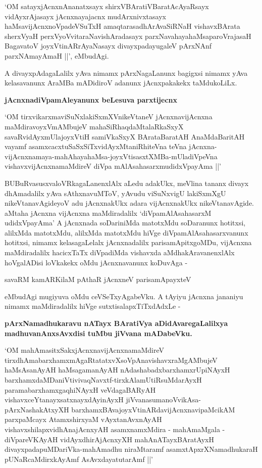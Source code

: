 `OM satayxjAcnxnAnanatxsayx shirxVBAratiVBaratAcAyaRsayx vidAyxrAjasayx jAcnxnayajacnx mudArxnivxtasayx haMsa\-vi\-jAcnxnoV\-padeVSuTxH amaqtarasadhArAvaSiRNaH vishavxBArata sherxVyaH perxVyoVvitaraNavishAradasayx parxNavaha\-ya\-haMsa\-pa\-roVrajasaH BagavatoV joyxVtinARrAyaNasayx divayxpadayugaleV pArxNAnf parxNAmayA\-maH ||', eMbu\-dAgi.


A divayxpAdagaLalilx yAva nimamx pArxNagaLanunx bagigxsi nimamx yAva kelasavanunx AraMBa mADidiroV \-adanunx jAcnxpakakekx taMdukoLiLx.

{\bigskip
\noindent
{\large\bf jAcnxnadiVpamAleyanunx beLesuva parxtijecnx}}\label{page81}
\medskip

\noindent
`OM tirxvikarxmaviSuNxlakiSxmXVnikeVtaneV\label{81} jAcnxnavijAcnxna maMdiravoyxVmAMbujeV mahaSiR\-haqdaMtalaR\-kaSxyX savaR\-vidAyxmUlajoyxVtiH samiVkaSxyX BArataBaratAH AnaMda\-BaritAH vayamf asamxcacxtuSaSxSiTxvidAyxMtaniR\-hiteVna teVna jAcnxna-vijAcnxnamaya-mahAhayahaMsa-joyxVtisasxtXMBa-mUladiVpeVna vishavxvijAcnxnamaMdireV diV\-pa mAlAsahasarxmudidxVpayAma ||'

BUBuRvasusxvaloVRkagaLanenxlAlx aLedu adakUkx, meVlina tananx divayx dhAma\-dalilx yAva sAthxna\-vuM\-ToV, yAvudu viSuNxvigU lakiSxmXgU nikeVtanavAgideyoV adu jAcnxnakUkx adara vijAcnxnakUkx nikeVtana\-vAgide. aMtaha jAcnxna vijAcnxna maMdiradalilx `diVpamAlAsahasarxM udidxVpayAma' A jAcnxnada soDari\-niMda ma\-totxMdu soDaranunx hotitxsi, alilxMda matotxMdu, alilxMda matotxMdu hiVge diVpamAlAsahasarx\-vanunx hotitxsi, nimamx kelasagaLelalx jAcnxnadalilx parisamApitxgoMDu, vijAcnxna maMdiradalilx hacicxTaTx diVpadiMda vishavxda aMdhakAravanenxlAlx hoVgalADisi loVkakekx oMdu jAcnxnavanunx koDuvAga - 

\begin{shloka}
savaRM kamARKilaM pAthaR jAcnxneV parisamApayxteV
\end{shloka}

\noindent
eMbudAgi mugiyuva oMdu ceVSeTxyAgabeVku. A tAyiyu jAcnxna jananiyu nimamx maMdira\-dalilx hiVge sutxtisalapxTiTxdAdxLe -

{\bigskip
\noindent
{\large\bf pArxNamadhukaravu nATayx BAratiVya aDidAvaregaLalilxya madhuvanAnxsAvxdisi tuMbu jiVvana mADa\-beVku.}}\label{page81}
\medskip

`OM mahAmasitxSakxjAcnxnavijAcnxnamaMdireV\label{81} tirxdhAmabarxhamxmAgaRtatatxvXsoVpAnavishavxraMgAMbujeV haM\-sAsanAyAH haMsagamanAyAH nAdashabadxbarxhamxrUpiNAyxH barxhamxdaMDaniVtivivaqNavxtf-tirxkAlamUtiRsuMda\-rAyxH paramabarxhamxgaqhiNAyxH veVda\break\-gaBARyAH vishavxceYtanayxsatxnayxdAyinAyxH jiVvanasumanoVvikAsa-pArxNasha\-kAtxyXH barxhamx\-BAvajoyxVtinARdavijAcnxnavipaMcikAM parxpaMcayx AtamxshirxyaM vAyxtanAvxnAyAH vishavxshilapxvi\-dhAna\-jAcnxyAH asamxnamxMdira - mahAmaMgala - diVpareVKAyAH vidAyxdhi\break\-rAjAcnxyXH mahAnATayxBAratAyxH divayx\-pada\-puMDariVka-mahAmadhu niraMtaramf asamx\-tApxrXNamadhukaraH pUNaRcaMdirxkAyAmf AsAvxdayatuta\-rA\-mf ||'

